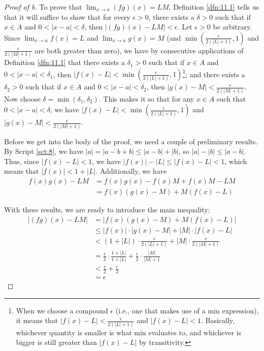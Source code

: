 \documentclass[../main.tex]{subfiles}
\begin{document}
\begin{theorem}
\begin{proof}[Proof of b]
        To prove that $\lim_{x\to a}(fg)(x)=LM$, Definition \ref{dfn:11.1} tells us that it will suffice to show that for every $\epsilon>0$, there exists a $\delta>0$ such that if $x\in A$ and $0<|x-a|<\delta$, then $|(fg)(x)-LM|<\epsilon$. Let $\epsilon>0$ be arbitrary. Since $\lim_{x\to a}f(x)=L$ and $\lim_{x\to a}g(x)=M$ (and $\min(\frac{\epsilon}{2(|L|+1)},1)$ and $\frac{\epsilon}{2(|M|+1)}$ are both greater than zero), we have by consecutive applications of Definition \ref{dfn:11.1} that there exists a $\delta_1>0$ such that if $x\in A$ and $0<|x-a|<\delta_1$, then $|f(x)-L|<\min(\frac{\epsilon}{2(|L|+1)},1)$\footnote{When we choose a compound $\epsilon$ (i.e., one that makes use of a min expression), it means that $|f(x)-L|<\frac{\epsilon}{2(|L|+1)}$ and $|f(x)-L|<1$. Basically, whichever quantity is smaller is what min evaluates to, and whichever is bigger is still greater than $|f(x)-L|$ by transitivity.}; and there exists a $\delta_2>0$ such that if $x\in A$ and $0<|x-a|<\delta_2$, then $|g(x)-M|<\frac{\epsilon}{2(|M|+1)}$. Now choose $\delta=\min(\delta_1,\delta_2)$. This makes it so that for any $x\in A$ such that $0<|x-a|<\delta$, we have $|f(x)-L|<\min(\frac{\epsilon}{2(|L|+1)},1)$ and $|g(x)-M|<\frac{\epsilon}{2(|M|+1)}$.\par
        Before we get into the body of the proof, we need a couple of preliminary results. By Script \ref{sct:8}, we have $|a|=|a-b+b|\leq|a-b|+|b|$, so $|a|-|b|\leq|a-b|$. Thus, since $|f(x)-L|<1$, we have $|f(x)|-|L|\leq|f(x)-L|<1$, which means that $|f(x)|<1+|L|$. Additionally, we have
        \begin{align*}
            f(x)g(x)-LM &= f(x)g(x)-f(x)M+f(x)M-LM\\
            &= f(x)(g(x)-M)+M(f(x)-L)
        \end{align*}\par
        With these results, we are ready to introduce the main inequality:
        \begin{align*}
            |(fg)(x)-LM| &= |f(x)(g(x)-M)+M(f(x)-L)|\\
            &\leq |f(x)|\cdot|g(x)-M|+|M|\cdot|f(x)-L|\\
            &< (1+|L|)\cdot\frac{\epsilon}{2(|L|+1)}+|M|\cdot\frac{\epsilon}{2(|M|+1)}\\
            &= \frac{\epsilon}{2}\cdot\frac{1+|L|}{1+|L|}+\frac{\epsilon}{2}\cdot\frac{|M|}{|M|+1}\\
            &< \frac{\epsilon}{2}+\frac{\epsilon}{2}\\
            &= \epsilon

\end{align*}
\end{proof}
\end{theorem}
\end{document}
